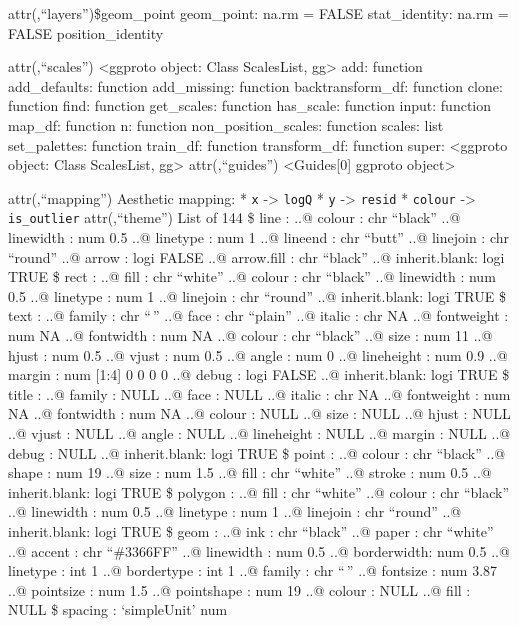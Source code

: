 \documentclass[
]{article}
\begin{document}
attr(,``layers'')\$geom\_point geom\_point: na.rm = FALSE
stat\_identity: na.rm = FALSE position\_identity

attr(,``scales'') \textless ggproto object: Class ScalesList,
gg\textgreater{} add: function add\_defaults: function add\_missing:
function backtransform\_df: function clone: function find: function
get\_scales: function has\_scale: function input: function map\_df:
function n: function non\_position\_scales: function scales: list
set\_palettes: function train\_df: function transform\_df: function
super: \textless ggproto object: Class ScalesList, gg\textgreater{}
attr(,``guides'') \textless Guides{[}0{]} ggproto object\textgreater{}

attr(,``mapping'') Aesthetic mapping: * \texttt{x} -\textgreater{}
\texttt{logQ} * \texttt{y} -\textgreater{} \texttt{resid} *
\texttt{colour} -\textgreater{} \texttt{is\_outlier} attr(,``theme'')
List of 144 \$ line : ..@ colour : chr ``black'' ..@ linewidth : num 0.5
..@ linetype : num 1 ..@ lineend : chr ``butt'' ..@ linejoin : chr
``round'' ..@ arrow : logi FALSE ..@ arrow.fill : chr ``black'' ..@
inherit.blank: logi TRUE \$ rect : ..@ fill : chr ``white'' ..@ colour :
chr ``black'' ..@ linewidth : num 0.5 ..@ linetype : num 1 ..@ linejoin
: chr ``round'' ..@ inherit.blank: logi TRUE \$ text : ..@ family : chr
``\,'' ..@ face : chr ``plain'' ..@ italic : chr NA ..@ fontweight : num
NA ..@ fontwidth : num NA ..@ colour : chr ``black'' ..@ size : num 11
..@ hjust : num 0.5 ..@ vjust : num 0.5 ..@ angle : num 0 ..@ lineheight
: num 0.9 ..@ margin : num {[}1:4{]} 0 0 0 0 ..@ debug : logi FALSE ..@
inherit.blank: logi TRUE \$ title : ..@ family : NULL ..@ face : NULL
..@ italic : chr NA ..@ fontweight : num NA ..@ fontwidth : num NA ..@
colour : NULL ..@ size : NULL ..@ hjust : NULL ..@ vjust : NULL ..@
angle : NULL ..@ lineheight : NULL ..@ margin : NULL ..@ debug : NULL
..@ inherit.blank: logi TRUE \$ point : ..@ colour : chr ``black'' ..@
shape : num 19 ..@ size : num 1.5 ..@ fill : chr ``white'' ..@ stroke :
num 0.5 ..@ inherit.blank: logi TRUE \$ polygon : ..@ fill : chr
``white'' ..@ colour : chr ``black'' ..@ linewidth : num 0.5 ..@
linetype : num 1 ..@ linejoin : chr ``round'' ..@ inherit.blank: logi
TRUE \$ geom : ..@ ink : chr ``black'' ..@ paper : chr ``white'' ..@
accent : chr ``\#3366FF'' ..@ linewidth : num 0.5 ..@ borderwidth: num
0.5 ..@ linetype : int 1 ..@ bordertype : int 1 ..@ family : chr ``\,''
..@ fontsize : num 3.87 ..@ pointsize : num 1.5 ..@ pointshape : num 19
..@ colour : NULL ..@ fill : NULL \$ spacing : `simpleUnit' num
\end{document}
